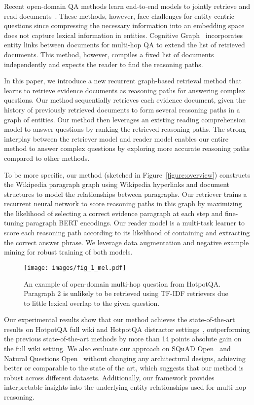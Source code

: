 Recent open-domain QA methods learn end-to-end models to jointly retrieve and read documents~\citep{denspi,lee-chang-toutanova:2019:ACL2019}.
These methods, however, face challenges for entity-centric questions since compressing the necessary information into an embedding space does not capture lexical information in entities. 
Cognitive Graph~\citep{cognitive_graph_2019} incorporates entity links between documents for multi-hop QA  to extend the list of retrieved documents.
This method, however, compiles a fixed list of documents independently and expects the reader to find the reasoning paths. 

In this paper, we introduce a new recurrent graph-based retrieval method that learns to retrieve evidence documents as reasoning paths for answering complex questions.
Our method sequentially retrieves each evidence document, given the history of previously retrieved  documents to form several reasoning paths in a graph of entities.
Our method then leverages an existing reading comprehension model to answer questions by ranking the retrieved reasoning paths.
The strong interplay between the retriever model and reader model enables our entire method to answer complex questions by exploring more accurate reasoning paths compared to other methods. 

To be more specific, our method (sketched in Figure~\ref{figure:overview}) constructs the Wikipedia paragraph graph using Wikipedia hyperlinks and document structures to model the relationships between paragraphs.
Our retriever trains a recurrent neural network to  score reasoning paths in this graph by maximizing the likelihood of selecting a correct evidence paragraph at each step and fine-tuning paragraph BERT encodings.
Our reader model is a multi-task learner to score each reasoning path according to its likelihood of containing and extracting the correct answer phrase. We leverage data augmentation and negative example mining for robust training of both models. 

\begin{figure}[t]
  \centering
  \texttt{[image: images/fig\_1\_mel.pdf]}  %
  \caption{An example of open-domain multi-hop question from HotpotQA. Paragraph 2 is unlikely to be retrieved using TF-IDF retrievers due to little lexical overlap to the given question. }
  \label{figure:examples_multi_hop_qa}
\end{figure}

Our experimental results show that our  method achieves the state-of-the-art results on HotpotQA full wiki and HotpotQA distractor settings~\citep{yang-etal-2018-hotpotqa}, outperforming the previous state-of-the-art methods by more than 14 points absolute  gain on the full wiki setting. 
We also evaluate our approach on SQuAD Open~\citep{chen2017reading} and Natural Questions Open~\citep{lee-chang-toutanova:2019:ACL2019} without changing any architectural designs, achieving better or comparable to the state of the art, which suggests that our method is robust across different datasets.
Additionally, our framework provides interpretable insights into the underlying entity relationships used for multi-hop reasoning. 

